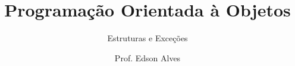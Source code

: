 \title{Programação Orientada à Objetos}
\subtitle{Estruturas e Exceções}
\date{}
\author{Prof. Edson Alves}
